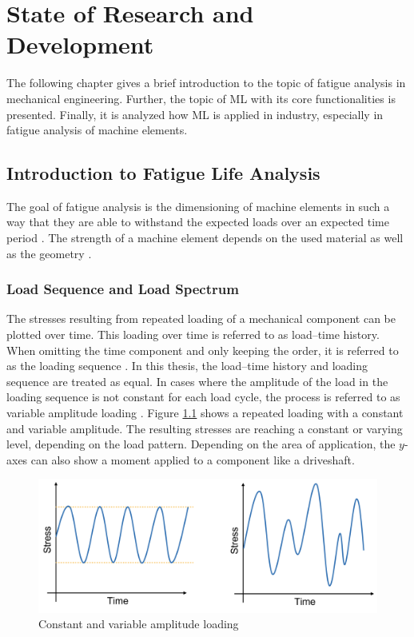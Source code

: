 \chapter{State of Research and Development}\label{chap2}
The following chapter gives a brief introduction to the topic of fatigue analysis in mechanical engineering. Further, the topic of ML with its core functionalities is presented. Finally, it is analyzed how ML is applied in industry, especially in fatigue analysis of machine elements.

\section{Introduction to Fatigue Life Analysis}
The goal of fatigue analysis is the dimensioning of machine elements in such a way that they are able to withstand the expected loads over an expected time period \cite{Haibach}. The strength of a machine element depends on the used material as well as the geometry \cite{Wittel}.

\subsection{Load Sequence and Load Spectrum}
The stresses resulting from repeated loading of a mechanical component can be plotted over time. This loading over time is referred to as load–time history. When omitting the time component and only keeping the order, it is referred to as the loading sequence \cite{HEULER}. In this thesis, the load–time history and loading sequence are treated as equal. In cases where the amplitude of the load in the loading sequence is not constant for each load cycle, the process is referred to as variable amplitude loading \cite{Facchinetti}.
Figure \ref{fig:VAL} shows a repeated loading with a constant and variable amplitude.
The resulting stresses are reaching a constant or varying level, depending on the load pattern. Depending on the area of application, the \(y\)-axes can also show a moment applied to a component like a driveshaft.

\begin{figure}[H]
	\centering
	\includegraphics[width=0.8\linewidth]{IMGs/loading.png}
	\caption{Constant and variable amplitude loading}
	\label{fig:VAL}
\end{figure}
 
